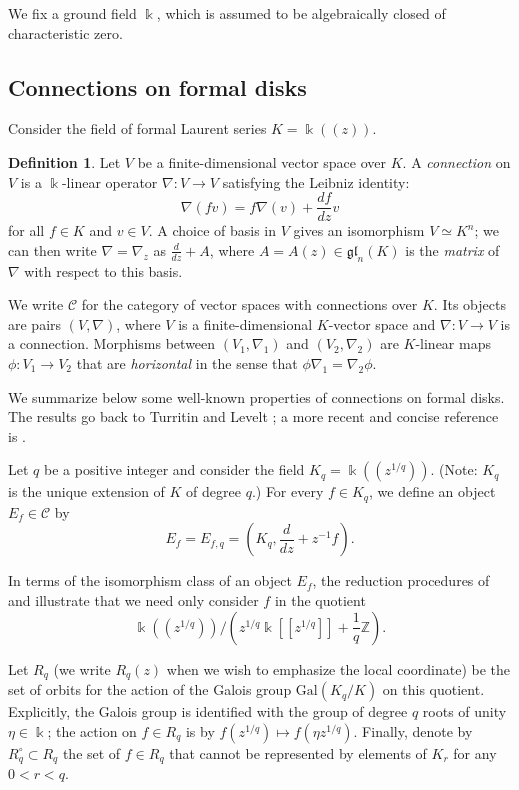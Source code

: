 \documentclass[11pt]{amsart}
\theoremstyle{theorem}
\theoremstyle{lemma}
\theoremstyle{corollary}
\theoremstyle{proposition}
\theoremstyle{definition}
\newtheorem{definition}{Definition}
\theoremstyle{remark}
\newcommand\gl{\mathfrak{gl}}
\begin{document}
We fix a ground field $\Bbbk$, which is assumed to be algebraically closed of characteristic zero.

\subsection{Connections on formal disks}
Consider the field of formal Laurent series $K=\Bbbk((z))$.

\begin{definition} \label{connection} Let $V$ be a finite-dimensional vector space over $K$. A \emph{connection} on $V$ is a $\Bbbk$-linear operator
$\nabla:V\to V$ satisfying the Leibniz identity:
\[\nabla(fv)=f\nabla(v)+\frac{df}{dz}v\]
for all $f\in K$ and $v\in V$. A choice of basis in $V$ gives an isomorphism $V\simeq K^n$; we can then write $\nabla=\nabla_z$ as $\frac{d}{dz}+A$, where
$A=A(z)\in\gl_n(K)$ is the \emph{matrix} of $\nabla$ with respect to this basis.
\end{definition}

We write $\mathcal{C}$ for the category of vector spaces with connections over $K$. Its objects are pairs
$(V, \nabla)$, where $V$ is a finite-dimensional $K$-vector space and $\nabla:V\to V$ is a connection. Morphisms between
$(V_1,\nabla_1)$ and $(V_2,\nabla_2)$ are $K$-linear maps $\phi:V_1\to V_2$ that are \emph{horizontal} in the sense that
$\phi\nabla_1=\nabla_2\phi$.

 We summarize below some well-known
properties of connections on formal disks. The results go back to Turritin \cite{turritin} and Levelt \cite{levelt};
a more recent and concise reference is \cite[Sections 5.9 and 5.10]{beilinson}.

Let $q$ be a positive integer and consider the field $K_q=\Bbbk((z^{1/q}))$. (Note: $K_q$ is the unique extension of $K$ of degree $q$.)
For every $f\in K_q$, we define an object $E_f\in\mathcal{C}$ by
\[E_f=E_{f,q}=\left(K_q,\frac{d}{dz}+z^{-1}f\right).\]

In terms of the isomorphism class of an object $E_f$, the reduction procedures of \cite{levelt} and \cite{turritin} illustrate that we need only consider $f$ in the quotient
\[\Bbbk((z^{1/q}))\Big/\left(z^{1/q}\Bbbk[[z^{1/q}]]+\frac{1}{q}\mathbb{Z}\right).\]

Let $R_q$ (we write $R_q(z)$ when we wish to emphasize the local coordinate) be the set of orbits for the action of the Galois group $\mathrm{Gal}(K_q/K)$ on this quotient. Explicitly, the
Galois group is identified with the group of degree $q$ roots of unity $\eta\in \Bbbk$; the action on $f\in R_q$ is by
$f(z^{1/q})\mapsto f(\eta z^{1/q})$. Finally, denote by $R^\circ_q\subset R_q$ the set of $f\in R_q$ that cannot be represented
by elements of $K_r$ for any $0<r<q$.
\end{document}
